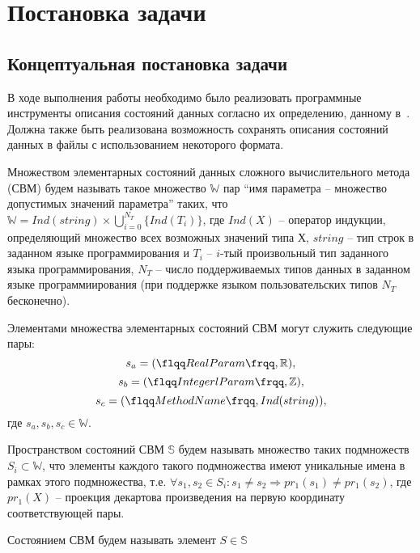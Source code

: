 \chapter{Постановка задачи}
\section{Концептуальная постановка задачи}

В ходе выполнения работы необходимо было реализовать программные инструменты описания состояний данных согласно их определению, данному в~\cite{SokolovPershin2018}. Должна также быть реализована возможность сохранять описания состояний данных в файлы с использованием некоторого формата.

\begin{definition}
    Множеством элементарных состояний данных сложного вычислительного метода (СВМ) будем называть такое множество \(\mathbb{W}\) пар ``имя параметра -- множество допустимых значений параметра'' таких, что \(\mathbb{W}=Ind(string)\times\bigcup_{i=0}^{N_T}\{Ind(T_i)\}\), где \(Ind(X)\) -- оператор индукции, определяющий множество всех возможных значений типа Х, \(string\) -- тип строк в заданном языке программирования и \(T_i\) -- \(i\)-тый произвольный тип заданного языка программирования, \(N_T\) -- число поддерживаемых типов данных в заданном языке программиирования (при поддержке языком пользовательских типов \(N_T\) бесконечно).
\end{definition}

Элементами множества элементарных состояний СВМ могут служить следующие пары:
$$s_a=(\flqq RealParam \frqq, \mathbb{R}),$$
$$s_b=(\flqq IntegerlParam \frqq, \mathbb{Z}),$$
$$s_c=(\flqq MethodName \frqq, Ind(string)),$$
где \(s_a, s_b, s_c \in \mathbb{W}\).

\begin{definition}
    Пространством состояний СВМ \(\mathbb{S}\) будем называть множество таких подмножеств \(S_i\subset\mathbb{W}\), что элементы каждого такого подмножества имеют уникальные имена в рамках этого подмножества, т.е. \(\forall s_1, s_2 \in S_i: s_1 \neq s_2 \Rightarrow pr_1(s_1) \neq pr_1(s_2)\), где \(pr_1(X)\) -- проекция декартова произведения на первую координату соответствующей пары.
\end{definition}

\begin{definition}
    Состоянием СВМ будем называть элемент \(S\in\mathbb{S}\)
\end{definition}

